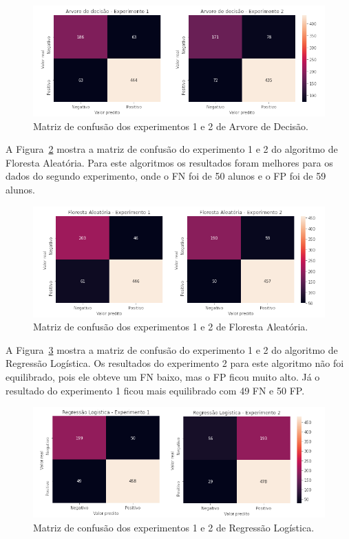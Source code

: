 \documentclass[diss,capa]{texufpel}
\begin{document}
\begin{figure}[htbp]
\centering \includegraphics[scale=.62]{imagens/matriz-confusao-arvore-decisao.png}
\caption{Matriz de confusão dos experimentos 1 e 2 de Arvore de Decisão.}
\label{fig:matriz-confusao-arvore-decisao}
\end{figure}

A Figura~\ref{fig:matriz-confusao-floresta-aleatoria} mostra a matriz de confusão do experimento 1 e 2 do algoritmo de Floresta Aleatória.
Para este algoritmos os resultados foram melhores para os dados do segundo experimento, onde o FN foi de 50 alunos e o FP foi de 59 alunos.

\begin{figure}[htbp]
\centering \includegraphics[scale=.62]{imagens/matriz-confusao-floresta-aleatoria.png}
\caption{Matriz de confusão dos experimentos 1 e 2 de Floresta Aleatória.}
\label{fig:matriz-confusao-floresta-aleatoria}
\end{figure}

A Figura~\ref{fig:matriz-confusao-regressao-logistica} mostra a matriz de confusão do experimento 1 e 2 do algoritmo de Regressão Logística.
Os resultados do experimento 2 para este algoritmo não foi equilibrado, pois ele obteve um FN baixo, mas o FP ficou muito alto.
Já o resultado do experimento 1 ficou mais equilibrado com 49 FN e 50 FP.


\begin{figure}[htbp]
\centering \includegraphics[scale=.62]{imagens/matriz-confusao-regressao-logistica.png}
\caption{Matriz de confusão dos experimentos 1 e 2 de Regressão Logística.}
\label{fig:matriz-confusao-regressao-logistica}
\end{figure}
\end{document}
